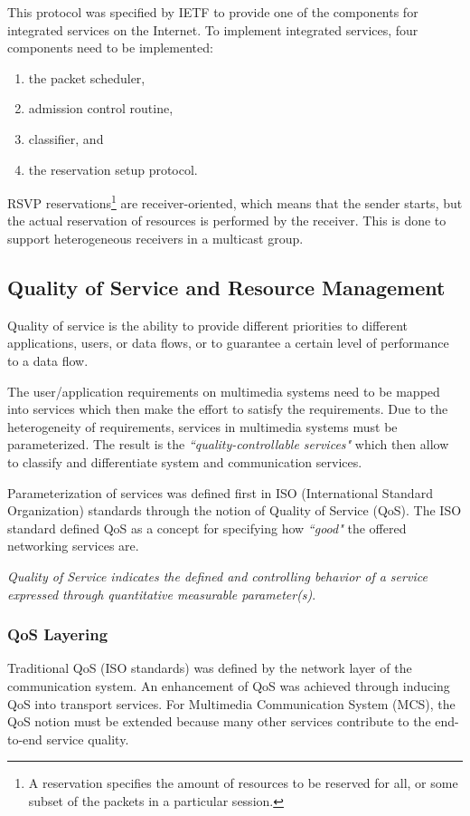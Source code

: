 This protocol was specified by IETF to provide one of the components for integrated services on the Internet. To implement integrated services, four components need to be implemented: 
\begin{enumerate}
	\item the packet scheduler, 
	\item admission control routine, 
	\item classifier, and 
	\item the reservation setup protocol.
\end{enumerate}


RSVP reservations\footnote{A reservation specifies the amount of resources to be reserved for all, or some subset of the packets in a particular session.} are receiver-oriented, which means that the sender starts, but the actual reservation of resources is performed by the receiver. This is done to support heterogeneous receivers in a multicast group.


\subsection{Quality of Service and Resource Management}
 Quality of service is the ability to provide different priorities to different applications, users, or data flows, or to guarantee a certain level of performance to a data flow. 

The user/application requirements on multimedia systems need to be mapped into services which then make the effort to satisfy the requirements. Due to the heterogeneity of requirements, services in multimedia systems must be parameterized. The result is the \textit{``quality-controllable services"} which then allow to classify and differentiate system and communication services.

Parameterization of services was defined first in ISO (International Standard Organization) standards through the notion of Quality of Service (QoS). The ISO standard defined QoS as a concept for specifying how \textit{``good"} the offered networking services are.

\emph{Quality of Service indicates the defined and controlling behavior of a service expressed through quantitative measurable parameter(s)}.

\subsubsection*{QoS Layering}
Traditional QoS (ISO standards) was defined by the network layer of the communication system. An enhancement of QoS was achieved through inducing QoS into transport services. For Multimedia Communication System (MCS), the QoS notion must be extended because many other services contribute to the end-to-end service quality.

